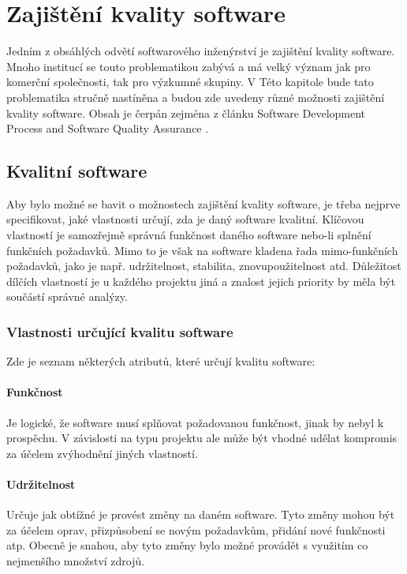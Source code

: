 \chapter{Zajištění kvality software}
	Jedním z obsáhlých odvětí softwarového inženýrství je zajištění kvality software. Mnoho institucí se touto problematikou zabývá a má velký význam jak pro komerční společnosti, tak pro výzkumné skupiny. V Této kapitole bude tato problematika stručně nastíněna a budou zde uvedeny různé možnosti zajištění kvality software. Obsah je čerpán zejména z článku Software Development Process and Software Quality Assurance \cite{swqa}.

\section{Kvalitní software}
	Aby bylo možné se bavit o možnostech zajištění kvality software, je třeba nejprve specifikovat, jaké vlastnosti určují, zda je daný software kvalitní. Klíčovou vlastností je samozřejmě správná funkčnost daného software nebo-li splnění funkčních požadavků. Mimo to je však na software kladena řada mimo-funkčních požadavků, jako je např. udržitelnost, stabilita, znovupoužitelnost atd. Důležitost dílčích vlastností je u každého projektu jiná a znalost jejich priority by měla být součástí správné analýzy.

	\subsection{Vlastnosti určující kvalitu software}
		Zde je seznam některých atributů, které určují kvalitu software:
	
		\subsubsection{Funkčnost}
			Je logické, že software musí splňovat požadovanou funkčnost, jinak by nebyl k prospěchu. V závislosti na typu projektu ale může být vhodné udělat kompromis za účelem zvýhodnění jiných vlastností.	
	
		\subsubsection{Udržitelnost}
			Určuje jak obtížné je provést změny na daném software. Tyto změny mohou být za účelem oprav, přizpůsobení se novým požadavkům, přidání nové funkčnosti atp. Obecně je snahou, aby tyto změny bylo možné provádět s využitím co nejmenšího množství zdrojů.
		
